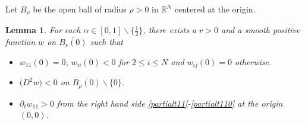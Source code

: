 \documentclass[10pt]{article}         %
\newtheorem{lemma}{Lemma}[section]
\numberwithin{equation}{section}
\begin{document}
Let $B_\rho$ be the open ball of radius $\rho>0$ in $\mathbb{R}^N$ centered at the origin. 
\begin{lemma}\label{npcl}
 For each $\alpha\in[0,1]\backslash\{\frac{1}{2}\}$, there exists a $r>0$  and a smooth  positive function $w$ on $\overline{B_r(0)}$ such that 
 \begin{itemize}
    \item[(\expandafter{\romannumeral1})] $w_{11}(0)=0$, $w_{ii}(0)<0$ for $2\leq i\leq N$ and $w_{ij}(0)=0$ otherwise.
    \item[(\expandafter{\romannumeral2})] $\big(D^{2}w\big)<0$ on $\overline{B_{\rho}(0)}\backslash \{0\}$.
    \item[(\expandafter{\romannumeral3})] $\partial_t w_{11}>0$ from the right hand side \eqref{partialt11}-\eqref{partialt110} at the origin $(0,0)$.
\end{itemize}
\end{lemma}
\end{document}
